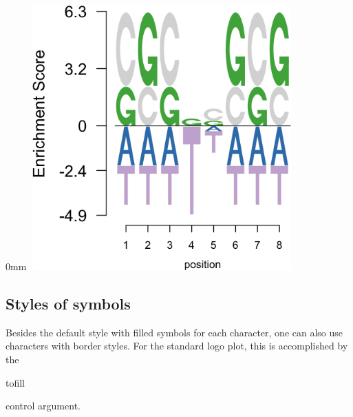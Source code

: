 \documentclass[12pt]{article}\usepackage[]{graphicx}\usepackage[usenames,dvipsnames]{color}
\newenvironment{knitrout}{}{} %
\begin{document}
\begin{knitrout}
\begin{adjustwidth}{\fltoffset}{0mm}
\includegraphics[width=4in,height=4in]{figure/col_prof-2} \hfill{}

\end{adjustwidth}
\end{knitrout}

\subsection{Styles of symbols}

Besides the default style with filled symbols for each character, one can also use characters with border styles. For the standard logo plot, this is accomplished by the \begin{verb} tofill \end{verb} control argument.
\end{document}
